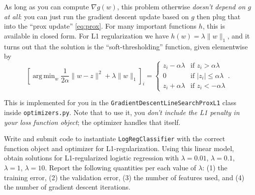 \documentclass{article}
\newenvironment{asking}{\begingroup\color{blu}}{\endgroup}
\DeclareMathOperator*{\argmin}{arg\,min}
\newcommand{\norm}[1]{\lVert #1 \rVert}
\begin{document}
{    As long as you can compute $\nabla g(w)$, this problem otherwise \emph{doesn't depend on $g$ at all}:
    you can just run the gradient descent update based on $g$ then plug that into the ``prox update'' \eqref{eq:prox}.
    For many important functions $h$, this is available in closed form.
    For L1 regularization we have $h(w) = \lambda \norm{w}_1$,
    and it turns out that the solution is the ``soft-thresholding'' function,
    given elementwise by
    \[
        \left[ \argmin_w \frac{1}{2 \alpha} \norm{w - z}^2 + \lambda \norm{w}_1 \right]_i
        = \begin{cases}
            z_i - \alpha \lambda & \text{if } z_i > \alpha \lambda \\
            0                    & \text{if } \lvert z_i \rvert \le \alpha \lambda \\
            z_i + \alpha \lambda & \text{if } z_i < -\alpha \lambda
        \end{cases}
    .\]
}

This is implemented for you in the \verb|GradientDescentLineSearchProxL1| class inside \verb|optimizers.py|.
Note that to use it, you \emph{don't include the L1 penalty in your loss function object};
the optimizer handles that itself.

\begin{asking}Write and submit code to instantiate \verb|LogRegClassifier| with the correct function object and optimizer for L1-regularization. Using this linear model, obtain solutions for L1-regularized logistic regression with $\lambda = 0.01$, $\lambda = 0.1$, $\lambda = 1$, $\lambda = 10$. Report the following quantities per each value of $\lambda$: (1) the training error, (2) the validation error, (3) the number of features used, and (4) the number of gradient descent iterations.\end{asking}
\end{document}

